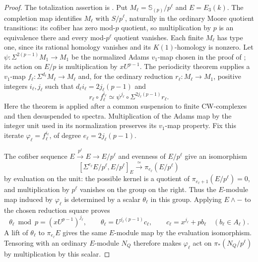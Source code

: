 \begin{proof}
The totalization assertion is
.
Put \(M_\ell=\mathbb S_{(p)}/p^\ell\) and \(E=E_3(k)\).
The completion map identifies \(M_\ell\) with \(S/p^\ell\),
naturally in the ordinary Moore quotient transitions: its cofiber
has zero mod-\(p\) quotient, so multiplication by \(p\) is an
equivalence there and every mod-\(p^\ell\) quotient vanishes.
Each finite \(M_\ell\) has type one, since its rational homology
vanishes and its \(K(1)\)-homology is nonzero.
Let \(\psi:\Sigma^{2(p-1)}M_1\to M_1\) be the normalized Adams
\(v_1\)-map chosen in the proof of
; its action on \(E/p\)
is multiplication by \(xU^{p-1}\).
The periodicity theorem
\cite[Theorem~1.5.4(i)--(ii), pp.~9--10]{RavenelNilpotence}
supplies a \(v_1\)-map \(f_\ell:\Sigma^{d_\ell}M_\ell\to M_\ell\)
and, for the ordinary reduction \(r_\ell:M_\ell\to M_1\),
positive integers \(i_\ell,j_\ell\) such that
\(d_\ell i_\ell=2j_\ell(p-1)\) and
\[
 r_\ell\circ f_\ell^{i_\ell}
   \simeq \psi^{j_\ell}\circ
          \Sigma^{2j_\ell(p-1)}r_\ell.
\]
Here the theorem is applied after a common suspension to finite
CW-complexes and then desuspended to spectra.  Multiplication of
the Adams map by the integer unit used in its normalization
preserves its \(v_1\)-map property.  Fix this iterate
\(\varphi_\ell=f_\ell^{i_\ell}\), of degree
\(e_\ell=2j_\ell(p-1)\).

The cofiber sequence \(E\xrightarrow{p^\ell}E\to E/p^\ell\)
and evenness of \(E/p^\ell\) give an isomorphism
\[
 [\Sigma^{e_\ell}E/p^\ell,E/p^\ell]_E
       \xrightarrow{\ \simeq\ }\pi_{e_\ell}(E/p^\ell)
\]
by evaluation on the unit: the possible kernel is a quotient of
\(\pi_{e_\ell+1}(E/p^\ell)=0\), and multiplication by
\(p^\ell\) vanishes on the group on the right.
Thus the \(E\)-module map induced by \(\varphi_\ell\) is determined
by a scalar \(\theta_\ell\) in this group.  Applying \(E\wedge-\)
to the chosen reduction square proves
\[
 \theta_\ell\bmod p=(xU^{p-1})^{j_\ell},\qquad
 \theta_\ell=U^{j_\ell(p-1)}c_\ell,\qquad
 c_\ell=x^{j_\ell}+p b_\ell\quad(b_\ell\in A_\ell).
\]
A lift of \(\theta_\ell\) to \(\pi_{e_\ell}E\) gives the same
\(E\)-module map by the evaluation isomorphism.  Tensoring with an
ordinary \(E\)-module \(N_Q\) therefore makes
\(\varphi_\ell\) act on \(\pi_*(N_Q/p^\ell)\) by multiplication
by this scalar.


\end{proof}
